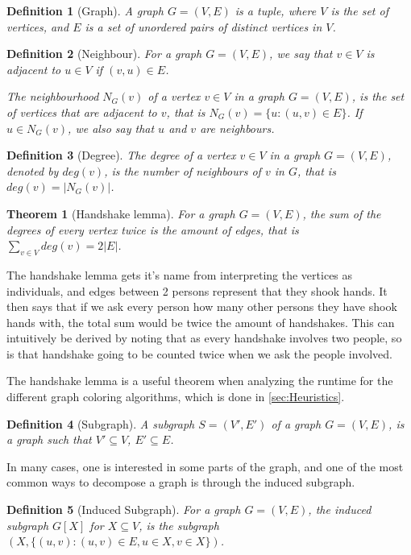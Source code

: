 \documentclass[a4paper]{article}
\newtheorem{theorem}{Theorem}[section]
\newtheorem{definition}{Definition}[section]
\begin{document}
\begin{definition}[Graph]
    A graph $G = (V,E)$ is a tuple, where $V$ is the set of vertices, and $E$ is
    a set of unordered pairs of distinct vertices in $V$.
\end{definition}
\begin{definition}[Neighbour]
    For a graph $G = (V,E)$, we say that $v \in V$ is adjacent to 
    $u \in V$ if $(v,u) \in E$. 

    The neighbourhood $N_G(v)$ of a vertex $v \in V$ in a graph $G = (V,E)$,
    is the set of vertices that are adjacent to $v$, that is 
    $N_G(v) = \{u : (u,v) \in E \}$. If $u \in N_G(v)$, we also say
    that $u$ and $v$ are neighbours.
\end{definition}
\begin{definition}[Degree]
    The degree of a vertex $v \in V$ in a graph $G = (V,E)$, denoted by 
    $deg(v)$, is the number of neighbours of $v$ in $G$, that is 
    $deg(v) = |N_G(v)|$.
\end{definition}
\begin{theorem}[Handshake lemma]{\cite{GraphBasics}}
    For a graph $G = (V,E)$, the sum of the degrees of every vertex twice is
    the amount of edges, that is $\sum_{v \in V} deg(v) = 2|E|$.
\end{theorem}

The handshake lemma gets it's name from interpreting the vertices as
individuals, and edges between 2 persons represent that they shook hands. It 
then says that if we ask every person how many other persons they have shook
hands with, the total sum would be twice the amount of handshakes. This can
intuitively be derived by noting that as every handshake involves two people, so
is that handshake going to be counted twice when we ask the people involved.

The handshake lemma is a useful theorem when analyzing the runtime for 
the different graph coloring algorithms, which is done in
\autoref{sec:Heuristics}.


\begin{definition}[Subgraph]
    A subgraph $S = (V',E')$ of a graph $G = (V,E)$, is a graph such that
    $V' \subseteq V$, $E' \subseteq E$.
\end{definition}
In many cases, one is interested in some parts of the graph, and one of the
most common ways to decompose a graph is through the induced subgraph.
\begin{definition}[Induced Subgraph]
    For a graph $G = (V,E)$, the induced subgraph $G[X]$ for $X \subseteq V$, is
    the subgraph $(X,\{(u,v) : (u,v) \in E, u \in X,v \in X\})$. 
\end{definition}
\end{document}
